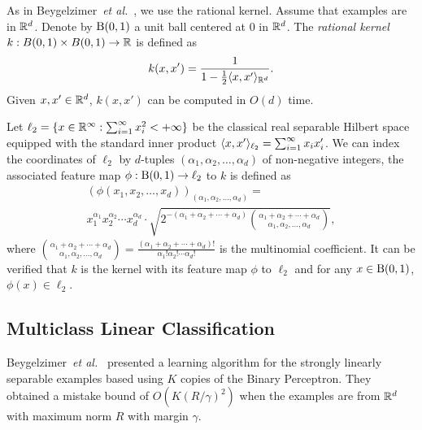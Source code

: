 As in Beygelzimer~{\em et al.}~\cite{BeygelzimerPSTWZ2019-separable}, we use the rational kernel.  Assume that examples are in ${\mathbb{R}}^d$.  Denote by ${\mathrm{B}}(0,1)$ a unit ball centered at $0$ in ${\mathbb{R}}^d$.
The {\em rational kernel} $k:B(0,1)\times B(0,1)\rightarrow{\mathbb{R}}$ is defined as
\[
k(x,x')=\frac{1}{1-\frac{1}{2}\langle x,x'\rangle_{{\mathbb{R}}^d}}.
\]
Given $x,x'\in{\mathbb{R}}^d$, $k(x,x')$ can be computed in $O(d)$ time.

Let $\ell_2=\{x\in{\mathbb{R}}^{\infty} : \sum_{i=1}^\infty x_i^2 < +\infty \}$ be the classical real separable Hilbert space equipped with the standard inner product $\langle x,x'\rangle_{\ell_2}=\sum_{i=1}^\infty x_i x'_i$.  We can index the coordinates of $\ell_2$ by $d$-tuples $(\alpha_1,\alpha_2,\ldots,\alpha_d)$ of non-negative integers, the associated feature map $\phi:{\mathrm{B}}(0,1)\rightarrow\ell_2$ to $k$ is defined as
\begin{multline}
\left(\phi(x_1,x_2,\ldots,x_d)\right)_{(\alpha_1,\alpha_2,\ldots,\alpha_d)} =
\\
x_1^{\alpha_1}x_2^{\alpha_2}\cdots x_d^{\alpha_d}
\cdot
\sqrt{2^{-(\alpha_1+\alpha_2+\cdots+\alpha_d)}{{\alpha_1+\alpha_2+\cdots+\alpha_d}\choose{\alpha_1,\alpha_2,\ldots,\alpha_d}}},
\label{eqn:phi}
\end{multline}
where
${{\alpha_1+\alpha_2+\cdots+\alpha_d}\choose{\alpha_1,\alpha_2,\ldots,\alpha_d}}
=
\frac{(\alpha_1+\alpha_2+\cdots+\alpha_d)!}{\alpha_1!\alpha_2!\cdots\alpha_d!}$
is the multinomial coefficient.  It can be verified that $k$ is the
kernel with its feature map $\phi$ to $\ell_2$ and for any
$x\in{\mathrm{B}}(0,1)$, $\phi(x)\in\ell_2$.

\subsection{Multiclass Linear Classification}

Beygelzimer~{\em et al.}~\cite{BeygelzimerPSTWZ2019-separable}
presented a learning algorithm for the strongly linearly separable
examples based using $K$ copies of the {\sc Binary Perceptron}.  They
obtained a mistake bound of $O(K(R/\gamma)^2)$ when the examples are
from ${\mathbb{R}}^d$ with maximum norm $R$ with margin $\gamma$.

